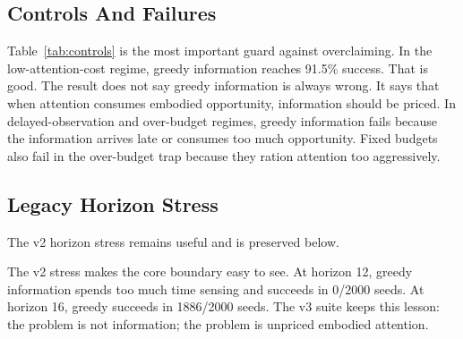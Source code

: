 \documentclass{article}
\begin{document}
\subsection{Controls And Failures}

\begin{table}[t]
\centering
\small
\setlength{\tabcolsep}{4pt}
\caption{Controls and failure regimes. Low attention cost lets greedy
information recover in success, while delayed observation, model mismatch, and
over-budget traps expose the cost of unpriced attention or under-sensing.}
\label{tab:controls}
\end{table}

Table~\ref{tab:controls} is the most important guard against overclaiming. In
the low-attention-cost regime, greedy information reaches 91.5\% success. That
is good. The result does not say greedy information is always wrong. It says
that when attention consumes embodied opportunity, information should be
priced. In delayed-observation and over-budget regimes, greedy information
fails because the information arrives late or consumes too much opportunity.
Fixed budgets also fail in the over-budget trap because they ration attention
too aggressively.

\subsection{Legacy Horizon Stress}

The v2 horizon stress remains useful and is preserved below.

\begin{table}[t]
\centering
\small
\caption{Legacy v2 horizon stress. Greedy information is bad when the horizon
is tight, but it recovers when the horizon is long enough.}
\label{tab:v2}

\end{table}

The v2 stress makes the core boundary easy to see. At horizon 12, greedy
information spends too much time sensing and succeeds in 0/2000 seeds. At
horizon 16, greedy succeeds in 1886/2000 seeds. The v3 suite keeps this lesson:
the problem is not information; the problem is unpriced embodied attention.
\end{document}
